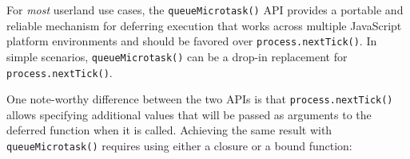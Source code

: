 \begin{Shaded}
\begin{Highlighting}[]
\OperatorTok{=} \NormalTok{(}\NormalTok{)}\OperatorTok{;}

\NormalTok{()}\NormalTok{(() }\KeywordTok{=\textgreater{}} \NormalTok{(}\NormalTok{))}\OperatorTok{;}
\NormalTok{(() }\KeywordTok{=\textgreater{}} \NormalTok{(}\NormalTok{))}\OperatorTok{;}
\NormalTok{(() }\KeywordTok{=\textgreater{}} \NormalTok{(}\NormalTok{))}\OperatorTok{;}
\end{Highlighting}
\end{Shaded}

For \emph{most} userland use cases, the \texttt{queueMicrotask()} API
provides a portable and reliable mechanism for deferring execution that
works across multiple JavaScript platform environments and should be
favored over \texttt{process.nextTick()}. In simple scenarios,
\texttt{queueMicrotask()} can be a drop-in replacement for
\texttt{process.nextTick()}.

\begin{Shaded}
\begin{Highlighting}[]
\NormalTok{(}\NormalTok{)}\OperatorTok{;}
\NormalTok{(() }\KeywordTok{=\textgreater{}}\NormalTok{ \{}
  \NormalTok{(}\NormalTok{)}\OperatorTok{;}
\NormalTok{\})}\OperatorTok{;}
\NormalTok{(}\NormalTok{)}\OperatorTok{;}
\end{Highlighting}
\end{Shaded}

One note-worthy difference between the two APIs is that
\texttt{process.nextTick()} allows specifying additional values that
will be passed as arguments to the deferred function when it is called.
Achieving the same result with \texttt{queueMicrotask()} requires using
either a closure or a bound function:

